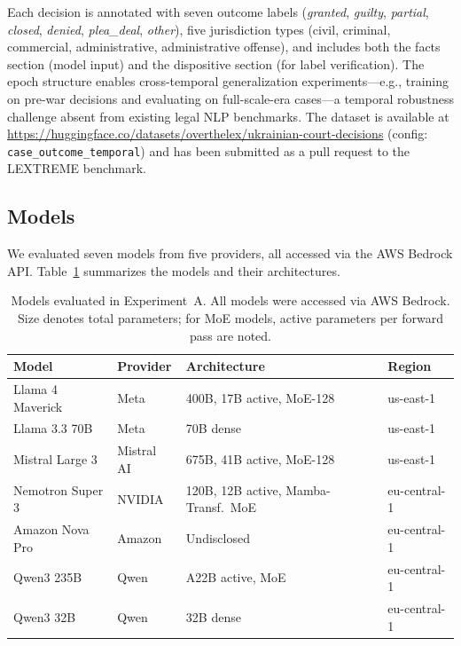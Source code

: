 \documentclass[11pt,a4paper]{article}
\begin{document}
Each decision is annotated with seven outcome labels (\textit{granted}, \textit{guilty}, \textit{partial}, \textit{closed}, \textit{denied}, \textit{plea\_deal}, \textit{other}), five jurisdiction types (civil, criminal, commercial, administrative, administrative offense), and includes both the facts section (model input) and the dispositive section (for label verification). The epoch structure enables cross-temporal generalization experiments---e.g., training on pre-war decisions and evaluating on full-scale-era cases---a temporal robustness challenge absent from existing legal NLP benchmarks. The dataset is available at \url{https://huggingface.co/datasets/overthelex/ukrainian-court-decisions} (config: \texttt{case\_outcome\_temporal}) and has been submitted as a pull request to the LEXTREME benchmark.

\subsection{Models}
\label{sec:models}

We evaluated seven models from five providers, all accessed via the AWS Bedrock API. Table~\ref{tab:models} summarizes the models and their architectures.

\begin{table}[t]
\centering
\caption{Models evaluated in Experiment~A. All models were accessed via AWS Bedrock. Size denotes total parameters; for MoE models, active parameters per forward pass are noted.}
\label{tab:models}
\begin{tabular}{llll}
\toprule
\textbf{Model} & \textbf{Provider} & \textbf{Architecture} & \textbf{Region} \\
\midrule
Llama 4 Maverick   & Meta      & 400B, 17B active, MoE-128 & us-east-1 \\
Llama 3.3 70B      & Meta      & 70B dense                  & us-east-1 \\
Mistral Large 3    & Mistral AI & 675B, 41B active, MoE-128 & us-east-1 \\
Nemotron Super 3   & NVIDIA    & 120B, 12B active, Mamba-Transf.\ MoE & eu-central-1 \\
Amazon Nova Pro    & Amazon    & Undisclosed                & eu-central-1 \\
Qwen3 235B         & Qwen      & A22B active, MoE           & eu-central-1 \\
Qwen3 32B          & Qwen      & 32B dense                  & eu-central-1 \\
\bottomrule
\end{tabular}
\end{table}
\end{document}
